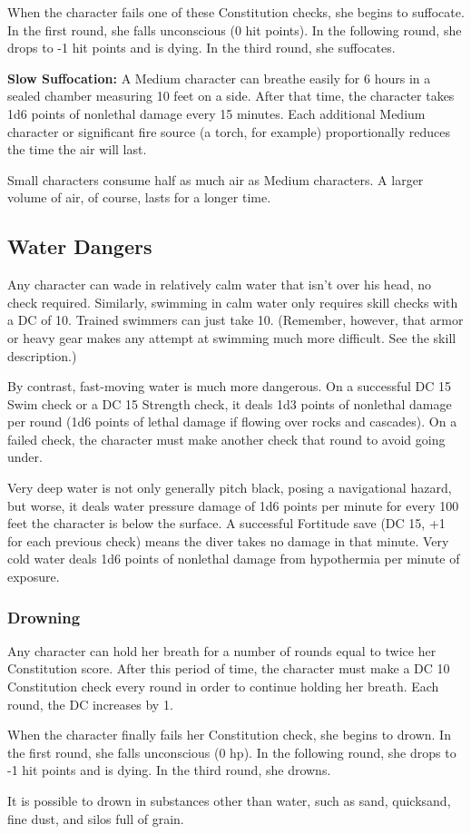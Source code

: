 When the character fails one of these Constitution checks, she begins to suffocate. 
In the first round, she falls unconscious (0 hit points). In the following round, 
she drops to -1 hit points and is dying. In the third round, she suffocates.

\textbf{Slow Suffocation:} A Medium character can breathe easily for 6 hours in 
a sealed chamber measuring 10 feet on a side. After that time, the character takes 
1d6 points of nonlethal damage every 15 minutes. Each additional Medium character 
or significant fire source (a torch, for example) proportionally reduces the time 
the air will last.

Small characters consume half as much air as Medium characters. A larger volume 
of air, of course, lasts for a longer time. 

\subsection{Water Dangers}

Any character can wade in relatively calm water that isn't over his head, no check 
required. Similarly, swimming in calm water only requires skill checks with a DC 
of 10. Trained swimmers can just take 10. (Remember, however, that armor or heavy 
gear makes any attempt at swimming much more difficult. See the  skill description.)

By contrast, fast-moving water is much more dangerous. On a successful DC 15 Swim 
check or a DC 15 Strength check, it deals 1d3 points of nonlethal damage per round 
(1d6 points of lethal damage if flowing over rocks and cascades). On a failed check, 
the character must make another check that round to avoid going under.

Very deep water is not only generally pitch black, posing a navigational hazard, 
but worse, it deals water pressure damage of 1d6 points per minute for every 100 
feet the character is below the surface. A successful Fortitude save (DC 15, +1 
for each previous check) means the diver takes no damage in that minute. Very cold 
water deals 1d6 points of nonlethal damage from hypothermia per minute of exposure.

\subsubsection{Drowning}

Any character can hold her breath for a number of rounds equal to twice her Constitution 
score. After this period of time, the character must make a DC 10 Constitution 
check every round in order to continue holding her breath. Each round, the DC increases 
by 1. 

When the character finally fails her Constitution check, she begins to drown. In 
the first round, she falls unconscious (0 hp). In the following round, she drops 
to -1 hit points and is dying. In the third round, she drowns.

It is possible to drown in substances other than water, such as sand, quicksand, 
fine dust, and silos full of grain.
